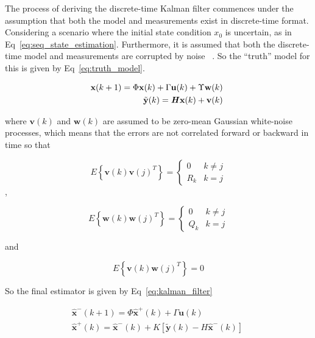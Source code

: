 The process of deriving the discrete-time Kalman filter commences under the assumption that both the model and measurements exist in discrete-time format. Considering a scenario where the initial state condition $x_{0}$ is uncertain, as in Eq~\ref{eq:seq_state_estimation}. Furthermore, it is assumed that both the discrete-time model and measurements are corrupted by noise ~\cite{crassidis2004dynamic}. So the ``truth'' model for this is given by Eq~\ref{eq:truth_model}.

\begin{subequations}
\begin{align}
    \textbf{x}(k + 1) = \Phi \textbf{x}(k) + \Gamma \textbf{u}(k) + \Upsilon \textbf{w}(k) \\
    \tilde{\textbf{y}}(k) = \textbf{\textit{H}} \textbf{x}(k) + \textbf{v}(k)
\end{align}
~\label{eq:truth_model}
\end{subequations}

where $\textbf{v}(k)$ and $\textbf{w}(k)$ are assumed to be zero-mean Gaussian white-noise processes, which means that the errors are not correlated forward or backward in time so that

\begin{equation}
    E \left\{ \textbf{v}(k) \textbf{v}(j)^{T} \right\} = 
    \begin{cases}
        0     & k \neq j \\
        R_{k} & k = j
    \end{cases}
\end{equation}
,

\begin{equation}
    E \left\{ \textbf{w}(k) \textbf{w}(j)^{T} \right\} = 
    \begin{cases}
        0     & k \neq j \\
        Q_{k} & k = j
    \end{cases}
\end{equation}

and 

\begin{equation}
    E \left\{ \textbf{v}(k) \textbf{w}(j)^{T} \right\} = 0
\end{equation}

So the final estimator is given by Eq~\ref{eq:kalman_filter}

\begin{subequations}
\begin{align}
    \hat{\textbf{x}}^{-}(k + 1) = \Phi \hat{\textbf{x}}^{+}(k) + \Gamma \textbf{u}(k) \\
    \hat{\textbf{x}}^{+}(k) = \hat{\textbf{x}}^{-}(k) + K \left[ \tilde{\textbf{y}}(k) - H \hat{\textbf{x}}^{-}(k) \right]
\end{align}
~\label{eq:kalman_filter}
\end{subequations}

